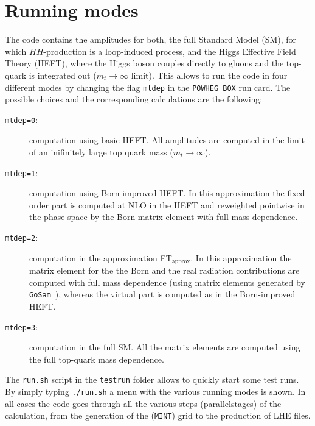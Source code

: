 \documentclass[paper]{JHEP3}
\newcommand\POWHEGBOX{{\tt POWHEG BOX}}
\newcommand\ftapprox{FT$_{\mathrm{approx}}$\xspace}
\begin{document}
\section{Running modes}
The code contains the amplitudes for both, the full Standard Model
(SM), for which $HH$-production is a loop-induced process, and the
Higgs Effective Field Theory (HEFT), where the Higgs boson couples
directly to gluons and the top-quark is integrated out ($m_t\to\infty$
limit).  This allows to run the code in four different modes by
changing the flag {\tt mtdep} in the \POWHEGBOX{} run card. The
possible choices and the corresponding calculations are the following:
\begin{description}
 \item[{\tt mtdep=0}:]{computation using basic HEFT. All amplitudes
   are computed in the limit of an inifinitely large top quark mass
   ($m_t\to\infty$).}
 \item[{\tt mtdep=1}:]{computation using Born-improved HEFT. In this
   approximation the fixed order part is computed at NLO in the HEFT
   and reweighted pointwise in the phase-space by the Born matrix
   element with full mass dependence.}
 \item[{\tt mtdep=2}:]{computation in the approximation \ftapprox. In
   this approximation the matrix element for the the Born and the real
   radiation contributions are computed with full mass dependence
   (using matrix elements generated by {\tt
     GoSam}~\cite{Cullen:2014yla}), whereas the virtual part is
   computed as in the Born-improved HEFT. }
 \item[{\tt mtdep=3}:]{computation in the full SM. All the matrix
   elements are computed using the full top-quark mass dependence.}
\end{description}

The {\tt run.sh} script in the {\tt testrun} folder allows to quickly
start some test runs. By simply typing {\tt ./run.sh} a menu with the
various running modes is shown. In all cases the code goes through all
the various steps (parallelstages) of the calculation, from the
generation of the ({\tt MINT}) grid to the production of LHE files.
\end{document}
